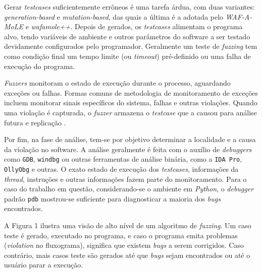 Gerar \textit{testcases} suficientemente errôneos é uma tarefa árdua, com duas variantes: \textit{generation-based} e \textit{mutation-based}, das quais a última é a adotada pelo \textit{WAF-A-MoLE} e \textit{wafamole++}. Depois de gerados, os \textit{testcases} alimentam o programa alvo, tendo variáveis de ambiente e outros parâmetros do software a ser testado devidamente configurados pelo programador. Geralmente um teste de \textit{fuzzing} tem como condição final um tempo limite (ou \textit{timeout}) pré-definido ou uma falha de execução do programa.

\textit{Fuzzers} monitoram o estado de execução durante o processo, aguardando exceções ou falhas.  Formas comuns de metodologia de monitoramento de exceções incluem monitorar sinais específicos do sistema, falhas e outras violações. Quando uma violação é capturada, o \textit{fuzzer} armazena o \textit{testcase} que a causou para análise futura e replicação \cite{li2018fuzzing}.

Por fim, na fase de análise, tem-se por objetivo determinar a localidade e a causa da violação no software. A análise geralmente é feita com o auxílio de \textit{debuggers} como \verb+GDB+, \verb+windbg+ ou outras ferramentas de análise binária, como a \verb+IDA Pro+, \verb+OllyObg+ e outras. O exato estado de execução dos \textit{testcases}, informações da \textit{thread}, instruções e outras informações fazem parte do monitoramento. Para o caso do trabalho em questão, considerando-se o ambiente em \textit{Python}, o \textit{debugger} padrão \verb+pdb+ mostrou-se suficiente para diagnosticar a maioria dos \textit{bugs} encontrados. 

A Figura 1 ilustra uma visão de alto nível de um algoritmo de \textit{fuzzing}. Um caso teste é gerado, executado no programa, e caso o programa emita problemas (\textit{violation} no fluxograma), significa que existem \textit{bugs} a serem corrigidos. Caso contrário, mais casos teste são gerados até que \textit{bugs} sejam encontrados ou até o usuário parar a execução.

